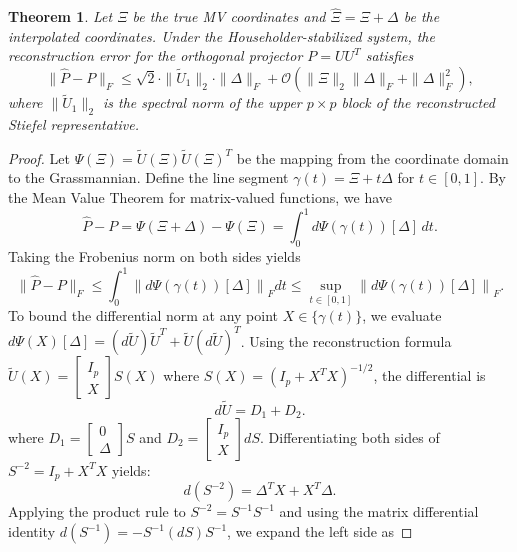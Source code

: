 \documentclass[10pt,a4paper]{amsart}
\newtheorem{theorem}{Theorem}
\begin{document}
\begin{theorem} \label{thm:err_prop}
Let $\Xi$ be the true MV coordinates and $\hat{\Xi} = \Xi + \Delta$ be the interpolated coordinates. Under the Householder-stabilized system, the reconstruction error for the orthogonal projector $P = UU^T$ satisfies
\begin{equation} \label{eq:err_bound_final}
\|\hat{P} - P\|_F \leq \sqrt{2} \cdot \|\widetilde U_1\|_2 \cdot \|\Delta\|_F + \mathcal{O}(\|\Xi\|_2 \|\Delta\|_F + \|\Delta\|_F^2),
\end{equation}
where $\|\widetilde U_1\|_2$ is the spectral norm of the upper $p \times p$ block of the reconstructed Stiefel representative.
\end{theorem}

\begin{proof}
Let $\Psi(\Xi) = \widetilde{U}(\Xi)\widetilde{U}(\Xi)^T$ be the mapping from the coordinate domain to the Grassmannian. Define the line segment $\gamma(t) = \Xi + t\Delta$ for $t \in [0,1]$. By the Mean Value Theorem for matrix-valued functions, we have
 $$
\hat{P} - P = \Psi(\Xi + \Delta) - \Psi(\Xi) = \int_0^1 d\Psi(\gamma(t))[\Delta] \, dt.
 $$
Taking the Frobenius norm on both sides yields
\begin{equation}
\|\hat{P} - P\|_F \leq \int_0^1 \left\| d\Psi(\gamma(t))[\Delta] \right\|_F dt \leq \sup_{t \in [0,1]} \left\| d\Psi(\gamma(t))[\Delta] \right\|_F. \label{eq:norm_integral}
\end{equation}
To bound the differential norm at any point $X \in \{\gamma(t)\}$, we evaluate $d\Psi(X)[\Delta] = (d\widetilde U)\widetilde U^T + \widetilde U(d\widetilde U)^T$. Using the reconstruction formula $\widetilde U(X) = \begin{bmatrix} I_p \\ X \end{bmatrix} S(X)$ where $S(X) = (I_p + X^T X)^{-1/2}$, the differential is
\begin{equation} \label{eq:du_exact_rigorous}
d\widetilde U = D_1 + D_2.
\end{equation}
where  $D_1 = \begin{bmatrix} 0 \\ \Delta \end{bmatrix} S$ and $D_2 = \begin{bmatrix} I_p \\ X \end{bmatrix} dS$.
Differentiating both sides of $S^{-2} = I_p + X^T X$ yields:
$$ d(S^{-2}) = \Delta^T X + X^T \Delta. $$
Applying the product rule to $S^{-2} = S^{-1}S^{-1}$ and using the matrix differential identity $d(S^{-1}) = -S^{-1}(dS)S^{-1}$, we expand the left side as

\end{proof}
\end{document}
